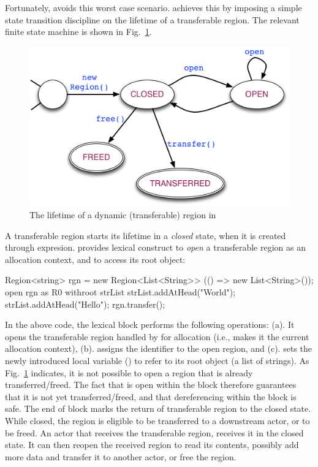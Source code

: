 Fortunately, \name avoids this worst case scenario.  \name achieves
this by imposing a simple state transition discipline on the lifetime
of a transferable region.  The relevant finite state machine is shown
in Fig.~\ref{fig:region-fsm}.

\begin{figure}
\includegraphics[scale=0.45]{region-fsm.png}
\caption{The lifetime of a dynamic (transferable) region in \name}
\label{fig:region-fsm}
\end{figure}

A transferable region starts its lifetime in a \emph{closed} state,
when it is created through  expresion. \name provides
 lexical construct to \emph{open} a transferable region as an
allocation context, and to access its root object:
\begin{codejava}
  Region<string> rgn = new Region<List<String>>
                        (() => new List<String>());
  open rgn as R0 withroot strList {
    strList.addAtHead("World");
    strList.addAtHead("Hello");
  }
  rgn.transfer();
\end{codejava}
In the above code, the  lexical block performs the
following operations: (a). It opens the transferable region handled by
 for allocation (i.e., makes it the current allocation
context), (b). assigns the identifier  to the open region, and
(c). sets the newly introduced local variable () to refer
to its root object (a list of strings). As Fig.~\ref{fig:region-fsm}
indicates, it is not possible to open a region that is already
transferred/freed. The fact that  is open within the block
therefore guarantees that it is not yet transferred/freed, and that
dereferencing  within the block is safe. The end of
 block marks the return of transferable region to the closed
state.  While closed, the region is eligible to be transferred to a
downstream actor, or to be freed.  An actor that receives the
transferable region, receives it in the closed state. It can then
reopen the received region to read its contents, possibly add more
data and transfer it to another actor, or free the region. 

